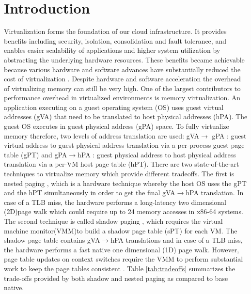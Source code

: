 \documentclass[sigconf]{sigplanconf}
\begin{document}
    \section{Introduction}
   Virtualization forms the foundation of our cloud infrastructure. It provides benefits including security, isolation, consolidation and fault tolerance, and enables easier scalability of applications and higher system utilization by abstracting the underlying hardware resources.
   These benefits became achievable because various hardware and software advances have substantially reduced the cost of virtualization \cite{gandhi}. Despite hardware and software acceleration \cite{gandhi} the overhead of virtualizing memory can still be very high.
   One of the largest contributors to performance overhead in virtualized environments is memory virtualization. An application executing on a guest operating system (OS) uses guest virtual addresses (gVA) that need to be translated to host physical addresses (hPA). The guest OS executes in guest physical address (gPA) space. To fully virtualize memory therefore, two levels of address translation are used: gVA$\rightarrow$ gPA : guest virtual address to guest physical address translation via a per-process guest page table (gPT) and gPA$\rightarrow$hPA : guest physical address to host physical address translation via a per-VM host page table (hPT). There are two state-of-the-art techniques to virtualize memory which provide different tradeoffs. The first is nested paging \cite{gandhi19}, which is a hardware technique whereby the host OS uses the gPT and the hPT simultaneously in order to get the final gVA$\rightarrow$hPA translation. In case of a TLB miss, the hardware performs a long-latency two dimensional (2D)page walk which could require up to 24 memory accesses \cite{gandhi19} in x86-64 systems. The second technique is called shadow paging \cite{gandhi57}, which requires the virtual machine monitor(VMM)to build a shadow page table (sPT) for each VM. The shadow page table contains gVA$\rightarrow$hPA translations and in case of a TLB miss, the hardware performs a fast native one dimensional (1D) page walk. However, page table updates on context switches require the VMM to perform substantial work to keep the page tables consistent \cite{gandhi10}. 
   Table \ref{tab:tradeoffs} summarizes the trade-offs provided by both shadow and nested paging as compared to base native.
   
\end{document}
